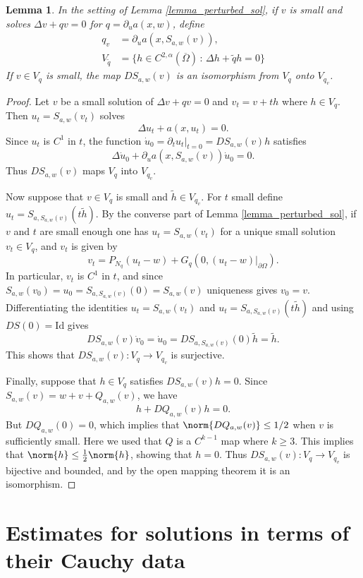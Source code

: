 \documentclass[11pt,a4paper]{amsart}
\newtheorem{Lemma}[Theorem]{Lemma}
\theoremstyle{definition}
\numberwithin{equation}{section}
\newcommand{\ol}[1]{\overline{#1}}
\newcommand{\p}{\partial}
\newcommand{\Om}{\Omega}
\begin{document}
\begin{Lemma} \label{lemma_s_derivative}
In the setting of Lemma \ref{lemma_perturbed_sol}, if $v$ is small and solves $\Delta v + qv = 0$ for $q = \p_u a(x,w)$, define 
\begin{align*}
q_v &= \p_u a(x, S_{a,w}(v)), \\
V_{\tilde{q}} &= \{ h \in C^{2,\alpha}(\ol{\Om}) \,:\, \Delta h + \tilde{q} h = 0 \}
\end{align*}
If $v \in V_q$ is small, the map $DS_{a,w}(v)$ is an isomorphism from $V_{q}$ onto $V_{q_v}$.
\end{Lemma}
\begin{proof}
Let $v$ be a small solution of $\Delta v + q v = 0$ and $v_t = v + th$ where $h \in V_{q}$. Then $u_t = S_{a,w}(v_t)$ solves 
\[
\Delta u_t + a(x, u_t) = 0.
\]
Since $u_t$ is $C^1$ in $t$, the function $\dot{u}_0 = \p_t u_t|_{t=0} = DS_{a,w}(v)h$ satisfies 
\[
\Delta \dot{u}_0 + \p_u a(x,S_{a,w}(v)) \dot{u}_0 = 0.
\]
Thus $DS_{a,w}(v)$ maps $V_{q}$ into $V_{q_v}$.

Now suppose that $v \in V_q$ is small and $\tilde{h} \in V_{q_v}$. For $t$ small define $u_t = S_{a,S_{a,w}(v)}(t \tilde{h})$. By the converse part of Lemma \ref{lemma_perturbed_sol}, if $v$ and $t$ are small enough one has $u_t = S_{a,w}(v_t)$ for a unique small solution $v_t \in V_q$, and $v_t$ is given by 
\[
v_t = P_{N_q}(u_t-w) + G_q(0, (u_t-w)|_{\p \Omega}).
\]
In particular, $v_t$ is $C^1$ in $t$, and since $S_{a,w}(v_0) = u_0 = S_{a,S_{a,w}(v)}(0) = S_{a,w}(v)$ uniqueness gives $v_0=v$. Differentiating the identities $u_t = S_{a,w}(v_t)$ and $u_t = S_{a,S_{a,w}(v)}(t \tilde{h})$ and using $DS(0) = \mathrm{Id}$ gives 
\[
DS_{a,w}(v) \dot{v}_0 = \dot{u}_0 = DS_{a,S_{a,w}(v)}(0)\tilde{h} = \tilde{h}.
\]
This shows that $DS_{a,w}(v): V_q \to V_{q_v}$ is surjective.

Finally, suppose that $h \in V_q$ satisfies $DS_{a,w}(v)h=0$. Since $S_{a,w}(v) = w + v + Q_{a,w}(v)$, we have 
\[
h + DQ_{a,w}(v)h = 0.
\]
But $DQ_{a,w}(0)=0$, which implies that $\norm{DQ_{a,w}(v)} \leq 1/2$ when $v$ is sufficiently small. Here we used that $Q$ is a $C^{k-1}$ map where $k \geq 3$.
This implies that $\norm{h} \leq \frac{1}{2} \norm{h}$, showing that $h=0$. Thus $DS_{a,w}(v): V_q \to V_{q_v}$ is bijective and bounded, and by the open mapping theorem it is an isomorphism.
\end{proof}

\section{Estimates for solutions in terms of their Cauchy data} \label{sec_quant_ucp}
\end{document}
